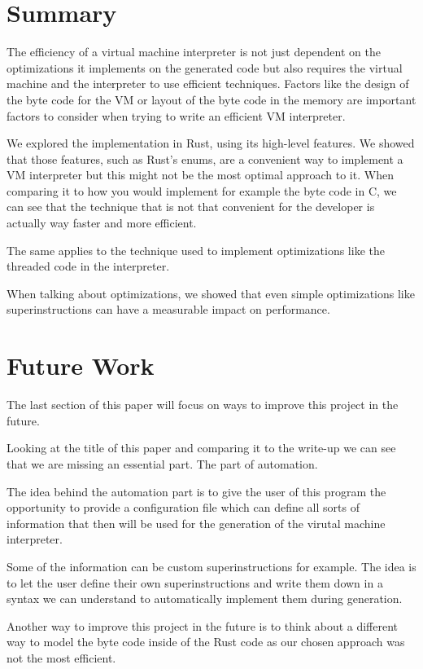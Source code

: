 \documentclass{article}
\begin{document}
\section{Summary}
The efficiency of a virtual machine interpreter is not just dependent on the
optimizations it implements on the generated code but also requires the virtual
machine and the interpreter to use efficient techniques. Factors like the
design of the byte code for the VM or layout of the byte code in the memory are
important factors to consider when trying to write an efficient VM interpreter.

We explored the implementation in Rust, using its high-level features. We
showed that those features, such as Rust's enums, are a convenient way to
implement a VM interpreter but this might not be the most optimal approach to it.
When comparing it to how you would implement for example the byte code in C, we
can see that the technique that is not that convenient for the developer is
actually way faster and more efficient.

The same applies to the technique used to implement optimizations like the
threaded code in the interpreter.

When talking about optimizations, we showed that even simple optimizations
like superinstructions can have a measurable impact on performance. 

\section{Future Work}
\label{sec:future}
The last section of this paper will focus on ways to improve this project
in the future.

Looking at the title of this paper and comparing it to the write-up we can see
that we are missing an essential part. The part of automation.

The idea behind the automation part is to give the user of this program
the opportunity to provide a configuration file which can define all 
sorts of information that then will be used for the generation of the
virutal machine interpreter.

Some of the information can be custom superinstructions for example. The idea
is to let the user define their own superinstructions and write them down in a
syntax we can understand to automatically implement them during generation.

Another way to improve this project in the future is to think about a different
way to model the byte code inside of the Rust code as our chosen approach was
not the most efficient. 
\end{document}
